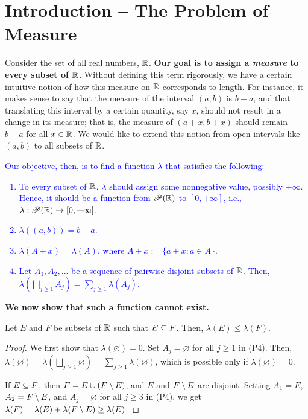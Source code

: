 \section{Introduction -- The Problem of Measure}

\noindent
Consider the set of all real numbers, $\mathbb{R}$. \textbf{Our goal is to assign a \textit{measure} to every subset of $\mathbb{R}$.} Without defining this term rigorously, we have a certain intuitive notion of how this measure on $\mathbb{R}$ corresponds to length. For instance, it makes sense to say that the measure of the interval $(a, b)$ is $b - a$, and that translating this interval by a certain quantity, say $x$, should not result in a change in its measure; that is, the measure of $(a + x, b + x)$ should remain $b - a$ for all $x \in \mathbb{R}$. We would like to extend this notion from open intervals like $(a, b)$ to all subsets of $\mathbb{R}$. \\

\textcolor{blue}{
Our objective, then, is to find a function $\lambda$ that satisfies the following:
\begin{enumerate}[label=(P\arabic*)]
    \item To every subset of $\mathbb{R}$, $\lambda$ should assign some nonnegative value, possibly $+\infty$. Hence, it should be a function from $\mathscr{P}(\mathbb{R})$ to $[0, +\infty]$, i.e., $\lambda: \mathscr{P}(\mathbb{R}) \to [0, +\infty]$.    
    \item $\lambda((a, b)) = b - a$.    
    \item $\lambda(A + x) = \lambda(A)$, where $A + x := \{ a + x : a \in A \}$.    
    \item Let $A_1, A_2,...$ be a sequence of pairwise disjoint subsets of $\mathbb{R}$. Then, $\lambda(\bigsqcup_{j \geq 1} A_j) = \sum_{j \geq 1} \lambda(A_j)$.
\end{enumerate}}

\textbf{We now show that such a function cannot exist.}


\begin{lemma}
Let $E$ and $F$ be subsets of $\mathbb{R}$ such that $E \subseteq F$. Then, $\lambda(E) \leq \lambda(F)$.
\end{lemma}

\begin{proof}
We first show that $\lambda(\varnothing) = 0$. Set $A_j = \varnothing$ for all $j \geq 1$ in (P4). Then, $\lambda(\varnothing) = \lambda \left( \bigsqcup_{j \geq 1} \varnothing \right) = \sum_{j \geq 1} \lambda(\varnothing)$, which is possible only if $\lambda(\varnothing) = 0$.

If $E \subseteq F$, then $F = E \cup (F \setminus E)$, and $E$ and $F \setminus E$ are disjoint. Setting $A_1 = E$, $A_2 = F \setminus E$, and $A_j = \varnothing$ for all $j \geq 3$ in (P4), we get $\lambda(F) = \lambda(E) + \lambda(F \setminus E) \geq \lambda(E)$.
\end{proof}

